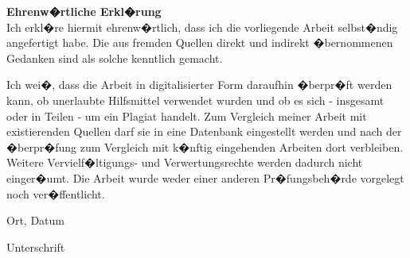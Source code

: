 \cleardoublepage
{}
\thispagestyle{empty}
\textbf{Ehrenw�rtliche Erkl�rung}\\

Ich erkl�re hiermit ehrenw�rtlich, dass ich die vorliegende Arbeit selbst�ndig angefertigt habe. Die aus fremden Quellen direkt und indirekt �bernommenen Gedanken sind als solche kenntlich gemacht.

Ich wei�, dass die Arbeit in digitalisierter Form daraufhin �berpr�ft werden kann, ob unerlaubte Hilfsmittel verwendet wurden und ob es sich - insgesamt oder in Teilen - um ein Plagiat handelt. Zum Vergleich meiner Arbeit mit existierenden Quellen darf sie in eine Datenbank eingestellt werden und nach der �berpr�fung zum Vergleich mit k�nftig eingehenden Arbeiten dort verbleiben. Weitere Verviel\-f�ltigungs- und Verwertungsrechte werden dadurch nicht einger�umt. Die Arbeit wurde weder einer anderen Pr�fungsbeh�rde vorgelegt noch ver�ffentlicht.


\vspace{2cm}
Ort, Datum
\vspace{2cm}

Unterschrift

